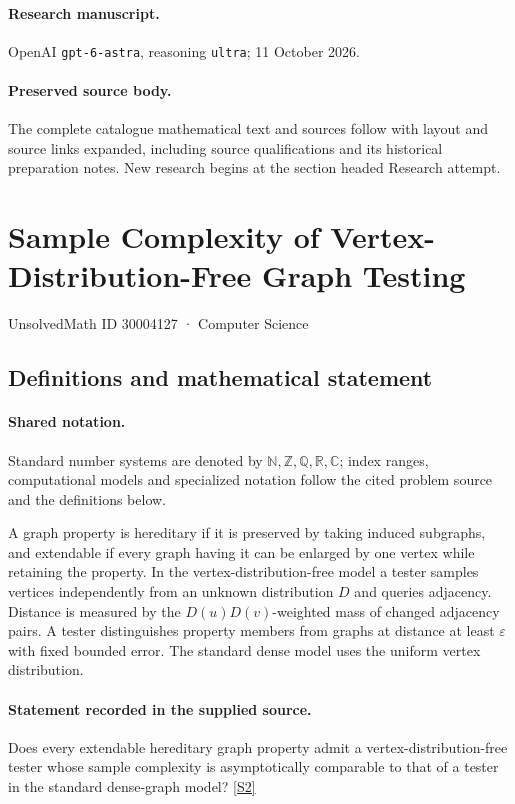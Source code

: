 \documentclass[11pt]{article}
\begin{document}
\paragraph{Research manuscript.} OpenAI \texttt{gpt-6-astra}, reasoning \texttt{ultra}; 11 October 2026.
\paragraph{Preserved source body.} The complete catalogue mathematical text and sources follow with layout and source links expanded, including source qualifications and its historical preparation notes. New research begins at the section headed Research attempt.

\section{Sample Complexity of Vertex-Distribution-Free Graph Testing}\label{30004127}
{\small UnsolvedMath ID 30004127 · Computer Science}
\subsection{Definitions and mathematical statement}

\paragraph{Shared notation.}Standard number systems are denoted by $\mathbb N,\mathbb Z,\mathbb Q,\mathbb R,\mathbb C$; index ranges, computational models and specialized notation follow the cited problem source and the definitions below.


A graph property is hereditary if it is preserved by taking induced subgraphs, and extendable if every graph having it can be enlarged by one vertex while retaining the property. In the vertex-distribution-free model a tester samples vertices independently from an unknown distribution $D$ and queries adjacency. Distance is measured by the $D(u)D(v)$-weighted mass of changed adjacency pairs. A tester distinguishes property members from graphs at distance at least $\varepsilon$ with fixed bounded error. The standard dense model uses the uniform vertex distribution.
\paragraph{Statement recorded in the supplied source.}
Does every extendable hereditary graph property admit a vertex-distribution-free tester whose sample complexity is asymptotically comparable to that of a tester in the standard dense-graph model? \href{https://doi.org/10.4171/owr/2019/19}{[S2]}
\end{document}
